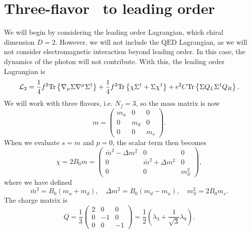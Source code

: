 \section{Three-flavor \chpt\ to leading order}
\label{section: three-flavor chpt to leading order}

We will begin by considering the leading order Lagrangian, which chiral dimension $D=2$.
However, we will not include the $\text{QED}$ Lagrangian, as we will not consider electromagnetic interaction beyond leading order.
In this case, the dynamics of the photon will not contribute.
With this, the leading order Lagrangian is~\autocite{eckerRoleResonancesChiral1989,gasserChiralPerturbationTheory1984,gasserChiralPerturbationTheory1985,schererIntroductionChiralPerturbation2002}
%
\begin{equation}
    \label{leading order three-flavor Lagrangian}
    \mathcal{L}_2 
    = \frac{1}{4}f^2 \text{Tr} \left\{ \nabla_\mu \Sigma \nabla^\mu \Sigma^\dagger \right\}
    + \frac{1}{4}f^2 \text{Tr} \left\{ \chi \Sigma^\dagger + \Sigma \chi^\dagger \right\}
    + e^2 C \text{Tr} \left\{ \Sigma Q_L \Sigma^\dagger Q_R \right\}.
\end{equation}
%
We will work with three flavors, i.e. $N_f = 3$, so the mass matrix is now
%
\begin{equation}
    m = 
    \begin{pmatrix}
        m_u & 0 & 0 \\
        0 & m_d & 0 \\
        0 & 0 & m_s
    \end{pmatrix}.
\end{equation}
%
When we evaluate $s = m$ and $p = 0$, the scalar term then becomes
%
\begin{equation}
    \chi = 2B_0 m = 
    \begin{pmatrix}
        \bar m^2 - \Delta m^2 & 0 &0\\
        0& \bar m^2 + \Delta m^2 & 0 \\
        0&0&m_S^2
    \end{pmatrix},
\end{equation}
%
where we have defined
%
\begin{equation}
    \bar m^2 =  B_0(m_u + m_d),\quad 
    \Delta m^2 = B_0(m_d - m_u), \quad
    m_S^2 = 2B_0 m_s.
\end{equation}
%
The charge matrix is
%
\begin{equation}
    \label{three-flavor charge matrix}
    Q = \frac{1}{3}
    \begin{pmatrix}
        2 & 0 & 0\\
        0 & -1 & 0\\
        0 & 0 & -1
    \end{pmatrix}
    = \frac{1}{2} \left( \lambda_3 + \frac{1}{\sqrt{3}} \lambda_8 \right).
\end{equation}
